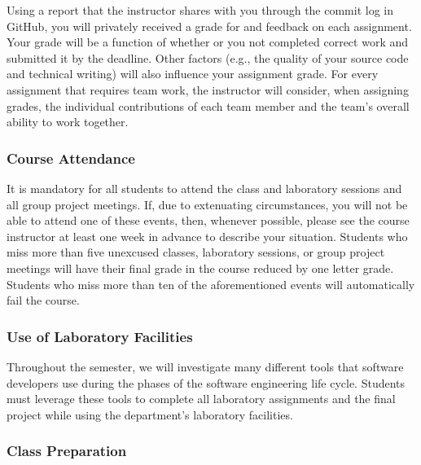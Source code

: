 \documentclass[11pt]{article}
\begin{document}
Using a report that the instructor shares with you through the commit log in GitHub, you will privately received a grade
for and feedback on each assignment. Your grade will be a function of whether or you not completed correct work and
submitted it by the deadline. Other factors (e.g., the quality of your source code and technical writing) will also
influence your assignment grade. For every assignment that requires team work, the instructor will consider, when
assigning grades, the individual contributions of each team member and the team's overall ability to work together.

\subsubsection*{Course Attendance}

It is mandatory for all students to attend the class and laboratory sessions and all group project meetings. If, due to
extenuating circumstances, you will not be able to attend one of these events, then, whenever possible, please see the
course instructor at least one week in advance to describe your situation. Students who miss more than five unexcused
classes, laboratory sessions, or group project meetings will have their final grade in the course reduced by one letter
grade. Students who miss more than ten of the aforementioned events will automatically fail the course.

\subsubsection*{Use of Laboratory Facilities}


Throughout the semester, we will investigate many different tools that software developers use during the phases of the
software engineering life cycle. Students must leverage these tools to complete all laboratory assignments and the final
project while using the department's laboratory facilities.

\subsubsection*{Class Preparation}
\end{document}
